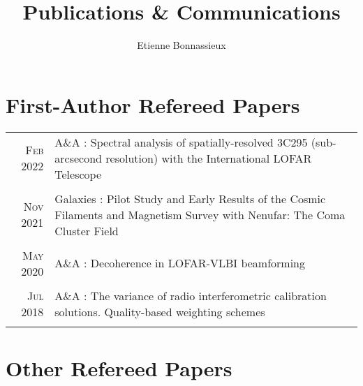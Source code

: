 \documentclass[11pt,a4paper,notitlepage]{article}
\author{Etienne Bonnassieux}
\title{Publications \& Communications}
\date{}
\begin{document}
\maketitle

\setcounter{page}{17}
\section{First-Author Refereed Papers}

\begin{tabular}{r|p{12.5cm}}
	
	\textsc{Feb 2022} & A\&A : Spectral analysis of spatially-resolved 3C295 (sub-arcsecond resolution) with the International LOFAR Telescope \citep{2022AA...658A..10B}\\
	\multicolumn{2}{c}{} \\

	
	\textsc{Nov 2021} & Galaxies : Pilot Study and Early Results of the Cosmic Filaments and Magnetism Survey with Nenufar: The Coma Cluster Field \citep{2021Galax...9..105B}\\
	\multicolumn{2}{c}{} \\
	
	\textsc{May 2020} & A\&A : Decoherence in LOFAR-VLBI beamforming \citep{2020AA...637A..51B}\\
	\multicolumn{2}{c}{} \\
	
	\textsc{Jul 2018} & A\&A : The variance of radio interferometric calibration solutions. Quality-based weighting schemes \citep{2018AA...615A..66B}\\
	\multicolumn{2}{c}{} \\
	
\end{tabular}


\section{Other Refereed Papers}
\end{document}
